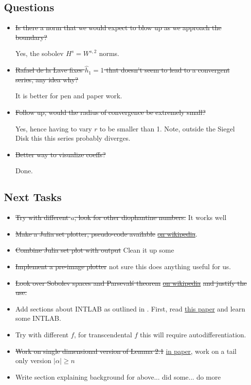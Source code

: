 \documentclass{article}
\theoremstyle{plain}
\theoremstyle{remark}
\begin{document}
\subsection{Questions}

\begin{itemize}[noitemsep, topsep=0pt]
\item \st{Is there a norm that we would expect to blow up as we approach the boundary?}

Yes, the sobolev $H^s = W^{s,2}$ norms. 

\item \st{Rafael de la Lave fixes $\hat{h}_1 = 1$ that doesn't seem to lead to a convergent series, any idea why?}

It is better for pen and paper work.

\item \st{Follow up, would the radius of convergence be extremely small?}

Yes, hence having to vary $r$ to be smaller than 1. 
Note, outside the Siegel Disk this this series probably diverges.

\item \st{Better way to visualize coeffs?}

Done. 
\end{itemize}

\subsection{Next Tasks}

\begin{itemize}[noitemsep, topsep=0pt]
\item \st{Try with different $a$, look for other diophantine numbers.} It works well
\item \st{Make a Julia set plotter, pseudo-code available }\href{https://en.wikipedia.org/wiki/Julia_set}{\st{on wikipedia}}.
\item \st{Combine Julia set plot with output} Clean it up some
\item \st{Implement a pre-image plotter} not sure this does anything useful for us.
\item \st{Look over Sobolev spaces and Parseval\'s theorem }\href{https://en.wikipedia.org/wiki/Sobolev_space}{\st{on wikipedia}}\st{ and justify the use.}
\item Add sections about INTLAB as outlined in \cite{Ru99a}. 
First, read \href{http://eprints.maths.manchester.ac.uk/1204/1/narep416.pdf}{this paper} and learn some INTLAB. \cite{intervalanalysis}
\item Try with different $f$, for transcendental $f$ this will require autodifferentiation.
\item \st{Work on single dimensional version of Lemma 2.1} \href{http://cosweb1.fau.edu/~jmirelesjames/preprints/reducibilityPublished.pdf}{in paper}, work on a tail only version $|\alpha| \geq n$ \cite{parampaper}
\item Write section explaining background for above... did some... do more
\end{itemize}

\medskip

\printbibliography
\end{document}
